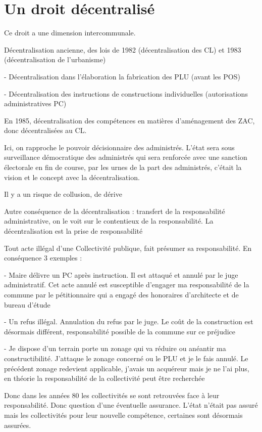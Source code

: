 		
		
	\section{Un droit décentralisé}
	
		Ce droit a une dimension intercommunale.
		
		Décentralisation ancienne, des lois de 1982 (décentralisation des CL) et 1983 (décentralisation de l’urbanisme)

		-	Décentralisation dans l’élaboration la fabrication des PLU (avant les POS)

		-	Décentralisation des instructions de constructions individuelles (autorisations administratives PC)

		En 1985, décentralisation des compétences en matières d’aménagement des ZAC, donc décentralisées au CL.

		
		Ici, on rapproche le pouvoir décisionnaire des administrés. L’état sera sous surveillance démocratique des administrés qui sera renforcée avec une sanction électorale en fin de course, par les urnes de la part des administrés, c’était la vision et le concept avec la décentralisation.

		
		Il y a un risque de collusion, de dérive

		
		Autre conséquence de la décentralisation : transfert de la responsabilité administrative, on le voit sur le contentieux de la responsabilité. La décentralisation est la prise de responsabilité

		Tout acte illégal d’une Collectivité publique, fait présumer sa responsabilité. En conséquence 3 exemples : 

		-	Maire délivre un PC après instruction. Il est attaqué et annulé par le juge administratif. Cet acte annulé est susceptible d’engager ma responsabilité de la commune par le pétitionnaire qui a engagé des honoraires d’architecte et de bureau d’étude

		-	Un refus illégal. Annulation du refus par le juge. Le coût de la construction est désormais différent, responsabilité possible de la commune sur ce préjudice

		-	Je dispose d’un terrain porte un zonage qui va réduire ou anéantir ma constructibilité. J’attaque le zonage concerné ou le PLU et je le fais annulé. Le précédent zonage redevient applicable, j’avais un acquéreur mais je ne l’ai plus, en théorie la responsabilité de la collectivité peut être recherchée

		
		Donc dans les années 80 les collectivités se sont retrouvées face à leur responsabilité. Donc question d’une éventuelle assurance. L’état n’était pas assuré mais les collectivités pour leur nouvelle compétence, certaines sont désormais assurées.

